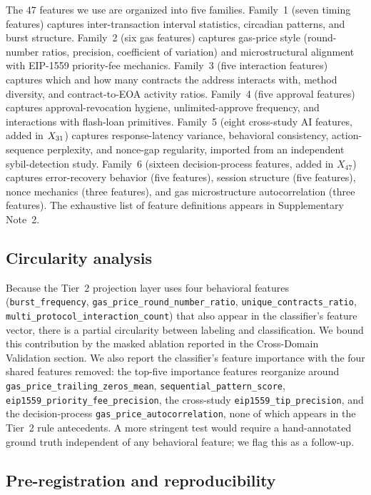 \documentclass[11pt,a4paper]{article}
\begin{document}
The $47$ features we use are organized into five families. Family~1
(seven timing features) captures inter-transaction interval statistics,
circadian patterns, and burst structure. Family~2 (six gas features)
captures gas-price style (round-number ratios, precision, coefficient
of variation) and microstructural alignment with EIP-1559 priority-fee
mechanics. Family~3 (five interaction features) captures which and how
many contracts the address interacts with, method diversity, and
contract-to-EOA activity ratios. Family~4 (five approval features)
captures approval-revocation hygiene, unlimited-approve frequency, and
interactions with flash-loan primitives. Family~5 (eight cross-study AI
features, added in $X_{31}$) captures response-latency variance,
behavioral consistency, action-sequence perplexity, and nonce-gap
regularity, imported from an independent sybil-detection study.
Family~6 (sixteen decision-process features, added in $X_{47}$) captures
error-recovery behavior (five features), session structure (five
features), nonce mechanics (three features), and gas microstructure
autocorrelation (three features). The exhaustive list of feature
definitions appears in Supplementary Note~2.

\subsection*{Circularity analysis}

Because the Tier~2 projection layer uses four behavioral features
(\texttt{burst\_frequency}, \texttt{gas\_price\_round\_number\_ratio},
\texttt{unique\_contracts\_ratio},
\texttt{multi\_protocol\_interaction\_count}) that also appear in the
classifier's feature vector, there is a partial circularity between
labeling and classification. We bound this contribution by the masked
ablation reported in the Cross-Domain Validation section. We also report
the classifier's feature importance with the four shared features
removed: the top-five importance features reorganize around
\texttt{gas\_price\_trailing\_zeros\_mean},
\texttt{sequential\_pattern\_score},
\texttt{eip1559\_priority\_fee\_precision}, the cross-study
\texttt{eip1559\_tip\_precision}, and the decision-process
\texttt{gas\_price\_autocorrelation}, none of which appears in the Tier~2
rule antecedents. A more stringent test would require a hand-annotated
ground truth independent of any behavioral feature; we flag this as a
follow-up.

\subsection*{Pre-registration and reproducibility}
\end{document}
